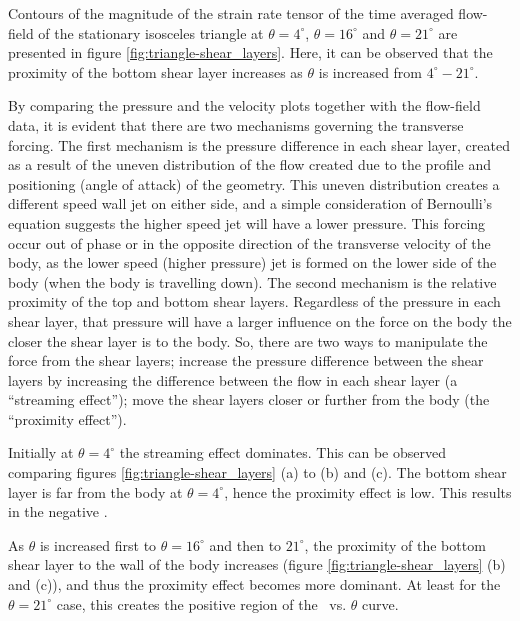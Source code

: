 


Contours of the magnitude of the strain rate tensor of the time averaged flow-field of the stationary isosceles triangle at  $\theta=4^{\circ}$, $\theta=16^{\circ}$ and $\theta=21^{\circ}$ are presented in figure \ref{fig:triangle-shear_layers}. Here, it can be observed that the proximity of the bottom shear layer increases as $\theta$ is increased from $4^{\circ}-21^{\circ}$. 


By comparing the pressure and the velocity plots together with the flow-field data, it is evident that there are two mechanisms governing the transverse forcing. The first mechanism is the pressure difference in each shear layer, created as a result of the uneven distribution of the flow created due to the profile and  positioning (angle of attack) of the geometry. This uneven distribution creates a different speed wall jet on either side, and a simple consideration of Bernoulli's equation suggests the higher speed jet will have a lower pressure. This forcing occur out of phase or in the opposite direction of the transverse velocity of the body, as the lower speed (higher pressure) jet is formed on the lower side of the body (when the body is travelling down). The second mechanism is the relative proximity of the top and bottom shear layers. Regardless of the pressure in each shear layer, that pressure will have a larger influence on the force on the body the closer the shear layer is to the body. So, there are two ways to manipulate the force from the shear layers; increase the pressure difference between the shear layers by increasing the difference between the flow in each shear layer (a ``streaming effect''); move the shear layers closer or further from the body (the ``proximity effect'').

Initially at $\theta= 4^{\circ}$ the streaming effect dominates. This can be observed comparing figures \ref{fig:triangle-shear_layers} (a) to (b) and (c). The  bottom shear layer is far from the body at $\theta= 4^{\circ}$, hence the proximity effect is low. This results in the negative \cy.   

As $\theta$ is increased first to $\theta=16^{\circ}$ and then to $21^{\circ}$, the proximity of the bottom shear layer to the wall of the body increases (figure \ref{fig:triangle-shear_layers} (b) and (c)), and thus the proximity effect becomes more dominant. At least for the $\theta = 21^{\circ}$ case, this creates the positive region of the \cy\ vs. $\theta$ curve.

